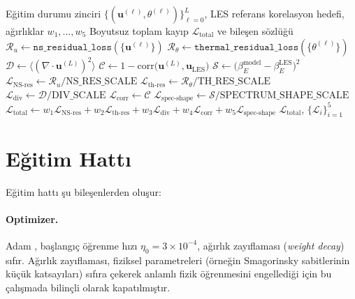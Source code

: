 \begin{algorithm}[H]
\caption{Kademe~3 minimal 5-terimli toplam kayıp birleşimi}
\label{alg:total_loss}
\begin{algorithmic}[1]
\Require Eğitim durumu zinciri $\{(\mathbf{u}^{(\ell)},\theta^{(\ell)})\}_{\ell=0}^{L}$, LES referans korelasyon hedefi, ağırlıklar $w_{1},\dots,w_{5}$
\Ensure Boyutsuz toplam kayıp $\mathcal{L}_{\mathrm{total}}$ ve bileşen sözlüğü
\State $\mathcal{R}_{u} \gets \texttt{ns\_residual\_loss}(\{\mathbf{u}^{(\ell)}\})$ 
\State $\mathcal{R}_{\theta} \gets \texttt{thermal\_residual\_loss}(\{\theta^{(\ell)}\})$
\State $\mathcal{D} \gets \langle(\nabla\cdot\mathbf{u}^{(L)})^{2}\rangle$
\State $\mathcal{C} \gets 1 - \mathrm{corr}\big(\mathbf{u}^{(L)}, \mathbf{u}_{\mathrm{LES}}\big)$
\State $\mathcal{S} \gets \big(\beta_{E}^{\mathrm{model}} - \beta_{E}^{\mathrm{LES}}\big)^{2}$
\State $\mathcal{L}_{\mathrm{NS\text{-}res}} \gets \mathcal{R}_{u}/\mathrm{NS\_RES\_SCALE}$
\State $\mathcal{L}_{\mathrm{th\text{-}res}} \gets \mathcal{R}_{\theta}/\mathrm{TH\_RES\_SCALE}$
\State $\mathcal{L}_{\mathrm{div}} \gets \mathcal{D}/\mathrm{DIV\_SCALE}$
\State $\mathcal{L}_{\mathrm{corr}} \gets \mathcal{C}$ 
\State $\mathcal{L}_{\mathrm{spec\text{-}shape}} \gets \mathcal{S}/\mathrm{SPECTRUM\_SHAPE\_SCALE}$
\State $\mathcal{L}_{\mathrm{total}} \gets w_{1}\mathcal{L}_{\mathrm{NS\text{-}res}} + w_{2}\mathcal{L}_{\mathrm{th\text{-}res}} + w_{3}\mathcal{L}_{\mathrm{div}} + w_{4}\mathcal{L}_{\mathrm{corr}} + w_{5}\mathcal{L}_{\mathrm{spec\text{-}shape}}$
\State \Return $\mathcal{L}_{\mathrm{total}}$, $\{\mathcal{L}_{i}\}_{i=1}^{5}$
\end{algorithmic}
\end{algorithm}

\section{Eğitim Hattı}
\label{sec:training_pipeline}

Eğitim hattı şu bileşenlerden oluşur:
\paragraph{Optimizer.} Adam \cite{kingma_adam_2015}, başlangıç öğrenme hızı $\eta_{0}=3\times 10^{-4}$, ağırlık zayıflaması (\textit{weight decay}) sıfır. Ağırlık zayıflaması, fiziksel parametreleri (örneğin Smagorinsky sabitlerinin küçük katsayıları) sıfıra çekerek anlamlı fizik öğrenmesini engellediği için bu çalışmada bilinçli olarak kapatılmıştır.

